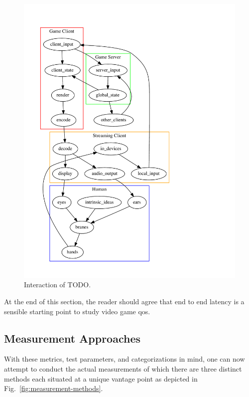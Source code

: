 \begin{figure}
  \centering
  \includegraphics[width=1.0\columnwidth]{../models/cycle.pdf}
  \caption{Interaction of TODO.}
  \label{fig:component-model}
\end{figure}

At the end of this section, the reader should agree that end to end latency is a sensible starting point to study video game qos.


\subsection{Measurement Approaches}
\label{sec:measurementapproaches}

With these metrics, test parameters, and categorizations in mind, one can now attempt to conduct the actual measurements of which there are three distinct methods each situated at a unique vantage point as depicted in Fig.~\ref{fig:measurement-methods}.


